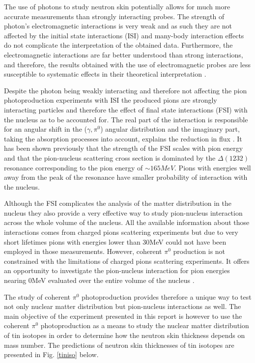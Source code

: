 \indent The use of photons  to study neutron skin potentially allows for much more accurate measurements than strongly interacting probes. The strength of photon's electromagnetic interactions is very weak and as such they are not affected by the initial state interactions (ISI) and many-body interaction effects do not complicate the interpretation of the obtained data. Furthermore, the electromagnetic interactions are far better understood than strong interactions, and therefore, the results obtained with the use of electromagnetic probes are less susceptible to systematic effects in their theoretical interpretation
\cite{claire}.

\indent Despite the photon being weakly interacting and therefore not affecting the pion photoproduction experiments with ISI the produced pions are strongly interacting particles and therefore the effect of final state interactions (FSI) with the nucleus as to be accounted for. The real part of the interaction is responsible for an angular shift in the ($\gamma,\pi^{0}$) angular distribution and the imaginary part, taking the absorption processes into account, explains the reduction in flux \cite{Proposal}. It has been shown previously that the strength of the FSI scales with pion energy and that the pion-nucleus scattering cross section is dominated by the $\Delta(1232)$ resonance corresponding to the pion energy of $\sim165MeV$. Pions with energies well away from the peak of the resonance have smaller probability of interaction with the nucleus.

\indent Although the FSI complicates the analysis of the matter distribution in the nucleus they also provide a very effective way to study pion-nucleus interaction across the whole volume of the nucleus. All the available information about those interactions comes from charged pions scattering experiments but due to very short lifetimes pions with energies lower than 30MeV could not have been employed in those measurements. However, coherent $\pi^{0}$ production is not constrained with the limitations of charged pions scattering experiments. It offers an opportunity to investigate the pion-nucleus interaction for pion energies nearing 0MeV evaluated over the entire volume of the nucleus \cite{claire}.

\indent The study of coherent $\pi^{0}$ photoproduction provides therefore a unique way to test not only nuclear matter distribution but pion-nucleus interactions as well. The main objective of the experiment presented in this report is however to use the coherent $\pi^{0}$ photoproduction as a means to study the nuclear matter distribution of tin isotopes in order to determine how the neutron skin thickness depends on mass number. The predictions of neutron skin thicknesses of tin isotopes are presented in Fig. \ref{tiniso} below.

